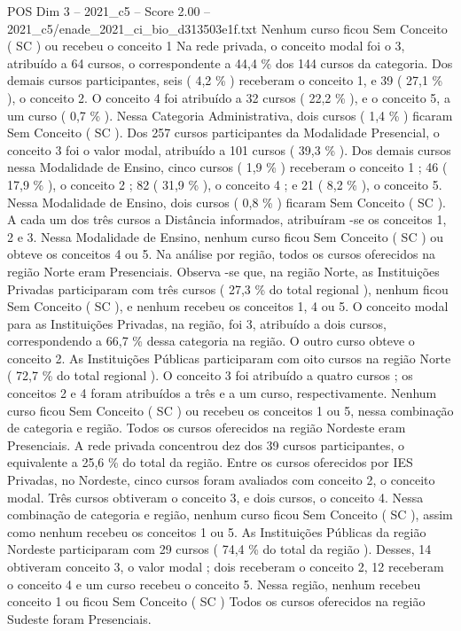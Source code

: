 \begin{textsample}{POS Dim 3 – 2021\_c5 – Score 2.00 – 2021\_c5/enade\_2021\_ci\_bio\_d313503e1f.txt}
Nenhum curso ficou Sem Conceito ( SC ) ou recebeu o conceito 1 Na rede privada, o conceito modal foi o 3, atribuído a 64 cursos, o correspondente a 44,4 \% dos 144 cursos da categoria.
Dos demais cursos participantes, seis ( 4,2 \% ) receberam o conceito 1, e 39 ( 27,1 \% ), o conceito 2.
O conceito 4 foi atribuído a 32 cursos ( 22,2 \% ), e o conceito 5, a um curso ( 0,7 \% ).
Nessa Categoria Administrativa, dois cursos ( 1,4 \% ) ficaram Sem Conceito ( SC ).
Dos 257 cursos participantes da Modalidade Presencial, o conceito 3 foi o valor modal, atribuído a 101 cursos ( 39,3 \% ).
Dos demais cursos nessa Modalidade de Ensino, cinco cursos ( 1,9 \% ) receberam o conceito 1 ; 46 ( 17,9 \% ), o conceito 2 ; 82 ( 31,9 \% ), o conceito 4 ; e 21 ( 8,2 \% ), o conceito 5.
Nessa Modalidade de Ensino, dois cursos ( 0,8 \% ) ficaram Sem Conceito ( SC ).
A cada um dos três cursos a Distância informados, atribuíram -se os conceitos 1, 2 e 3.
Nessa Modalidade de Ensino, nenhum curso ficou Sem Conceito ( SC ) ou obteve os conceitos 4 ou 5.
Na análise por região, todos os cursos oferecidos na região Norte eram Presenciais.
Observa -se que, na região Norte, as Instituições Privadas participaram com três cursos ( 27,3 \% do total regional ), nenhum ficou Sem Conceito ( SC ), e nenhum recebeu os conceitos 1, 4 ou 5.
O conceito modal para as Instituições Privadas, na região, foi 3, atribuído a dois cursos, correspondendo a 66,7 \% dessa categoria na região.
O outro curso obteve o conceito 2.
As Instituições Públicas participaram com oito cursos na região Norte ( 72,7 \% do total regional ).
O conceito 3 foi atribuído a quatro cursos ; os conceitos 2 e 4 foram atribuídos a três e a um curso, respectivamente.
Nenhum curso ficou Sem Conceito ( SC ) ou recebeu os conceitos 1 ou 5, nessa combinação de categoria e região.
Todos os cursos oferecidos na região Nordeste eram Presenciais.
A rede privada concentrou dez dos 39 cursos participantes, o equivalente a 25,6 \% do total da região.
Entre os cursos oferecidos por IES Privadas, no Nordeste, cinco cursos foram avaliados com conceito 2, o conceito modal.
Três cursos obtiveram o conceito 3, e dois cursos, o conceito 4.
Nessa combinação de categoria e região, nenhum curso ficou Sem Conceito ( SC ), assim como nenhum recebeu os conceitos 1 ou 5.
As Instituições Públicas da região Nordeste participaram com 29 cursos ( 74,4 \% do total da região ).
Desses, 14 obtiveram conceito 3, o valor modal ; dois receberam o conceito 2, 12 receberam o conceito 4 e um curso recebeu o conceito 5.
Nessa região, nenhum recebeu conceito 1 ou ficou Sem Conceito ( SC ) Todos os cursos oferecidos na região Sudeste foram Presenciais.

\end{textsample}
